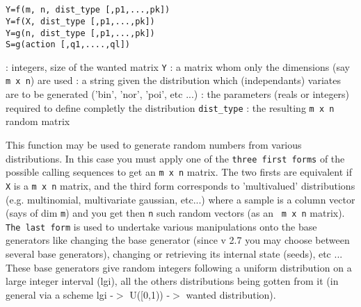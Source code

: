 
\begin{mandesc}
   \\
   \\
\end{mandesc}

\begin{calling_sequence}
\begin{verbatim}
Y=f(m, n, dist_type [,p1,...,pk])  
Y=f(X, dist_type [,p1,...,pk])  
Y=g(n, dist_type [,p1,...,pk])  
S=g(action [,q1,....,ql])  
\end{verbatim}
\end{calling_sequence}
\begin{parameters}
  \begin{varlist}
    : integers, size of the wanted matrix \verb!Y!
    : a matrix whom only the dimensions (say \verb!m x n!) are used
    : a string given the distribution which (independants) variates are to be 
    generated ('bin', 'nor', 'poi', etc ...)
    : the parameters (reals or integers) required to define completly the distribution 
    \verb!dist_type!
    : the resulting \verb!m x n! random matrix
  \end{varlist}
\end{parameters}

\begin{mandescription}
  This function may be used to generate random numbers from various distributions. In this 
  case you must apply one of the 
  \verb!three first forms! of the possible calling sequences to get an \verb!m x n! matrix. 
  The two firsts are equivalent if \verb!X! is a \verb!m x n! matrix, 
  and the third form corresponds to 'multivalued' distributions (e.g. multinomial, multivariate
  gaussian, etc...) where a sample is a column vector (says of dim \verb!m!)
  and you get then \verb!n! such random vectors (as an \verb! m x n! matrix). 
  \verb!The last form! is used to undertake various manipulations onto the base generators
  like changing the base generator (since v 2.7 you may choose between several base generators), 
  changing or retrieving its internal state (seeds), etc ... These base generators give random
  integers following a uniform distribution on a large integer interval (lgi), all the others 
  distributions being gotten from it (in general via a scheme lgi -$>$ U([0,1)) -$>$ wanted distribution).
\end{mandescription}

